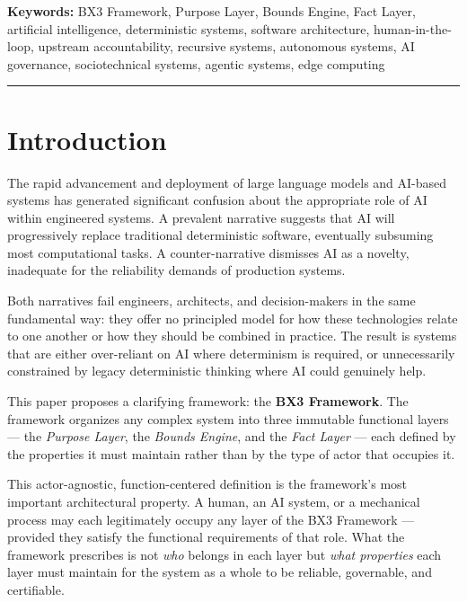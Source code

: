 \documentclass[12pt]{article}
\begin{document}
\vspace{0.5em}
\noindent\textbf{Keywords:} BX3 Framework, Purpose Layer, Bounds Engine, Fact Layer, artificial intelligence, deterministic systems, software architecture, human-in-the-loop, upstream accountability, recursive systems, autonomous systems, AI governance, sociotechnical systems, agentic systems, edge computing

\vspace{1em}
\hrule
\vspace{1em}

\onehalfspacing

\section{Introduction}
\label{sec:intro}

The rapid advancement and deployment of large language models and AI-based systems has generated significant confusion about the appropriate role of AI within engineered systems. A prevalent narrative suggests that AI will progressively replace traditional deterministic software, eventually subsuming most computational tasks. A counter-narrative dismisses AI as a novelty, inadequate for the reliability demands of production systems.

Both narratives fail engineers, architects, and decision-makers in the same fundamental way: they offer no principled model for how these technologies relate to one another or how they should be combined in practice. The result is systems that are either over-reliant on AI where determinism is required, or unnecessarily constrained by legacy deterministic thinking where AI could genuinely help.

This paper proposes a clarifying framework: the \textbf{BX3 Framework}. The framework organizes any complex system into three immutable functional layers --- the \textit{Purpose Layer}, the \textit{Bounds Engine}, and the \textit{Fact Layer} --- each defined by the properties it must maintain rather than by the type of actor that occupies it.

This actor-agnostic, function-centered definition is the framework's most important architectural property. A human, an AI system, or a mechanical process may each legitimately occupy any layer of the BX3 Framework --- provided they satisfy the functional requirements of that role. What the framework prescribes is not \textit{who} belongs in each layer but \textit{what properties} each layer must maintain for the system as a whole to be reliable, governable, and certifiable.
\end{document}
